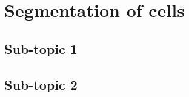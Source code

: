 
\section{Segmentation of cells}%
\label{sec:main}

\subsection{Sub-topic 1}

\subsection{Sub-topic 2}
